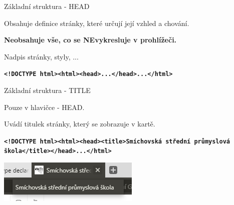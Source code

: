 \documentclass[aspectratio=1610]{beamer}
\begin{document}
\begin{frame}{Základní struktura - HEAD}
    \begin{cardTiny}
        \begin{flushleft}
            Obsahuje definice stránky, které určují její vzhled a chování.

            \textbf{Neobsahuje vše, co se NEvykresluje v prohlížeči.}

            Nadpis stránky, styly, ...
        \end{flushleft}
    \end{cardTiny}
    \begin{cardTiny}
        \begin{flushleft}
        \texttt{\textbf{<!DOCTYPE html><html><head>...</head>...</html>}}
        \end{flushleft}
    \end{cardTiny}
\end{frame}

\begin{frame}{Základní struktura - TITLE}
    \begin{cardTiny}
        \begin{flushleft}
            Pouze v hlavičce - HEAD.

            Uvádí titulek stránky, který se zobrazuje v kartě.
        \end{flushleft}
    \end{cardTiny}
    \begin{cardTiny}
        \begin{flushleft}
        \texttt{\textbf{<!DOCTYPE html><html><head><title>Smíchovská střední průmyslová škola</title></head>...</html>}}
        \end{flushleft}
    \end{cardTiny}
\end{frame}

\begin{frame}
    \begin{center}
        \includegraphics[width=\textwidth]{img/tab-ssps.png}
    \end{center}
\end{frame}
\end{document}
